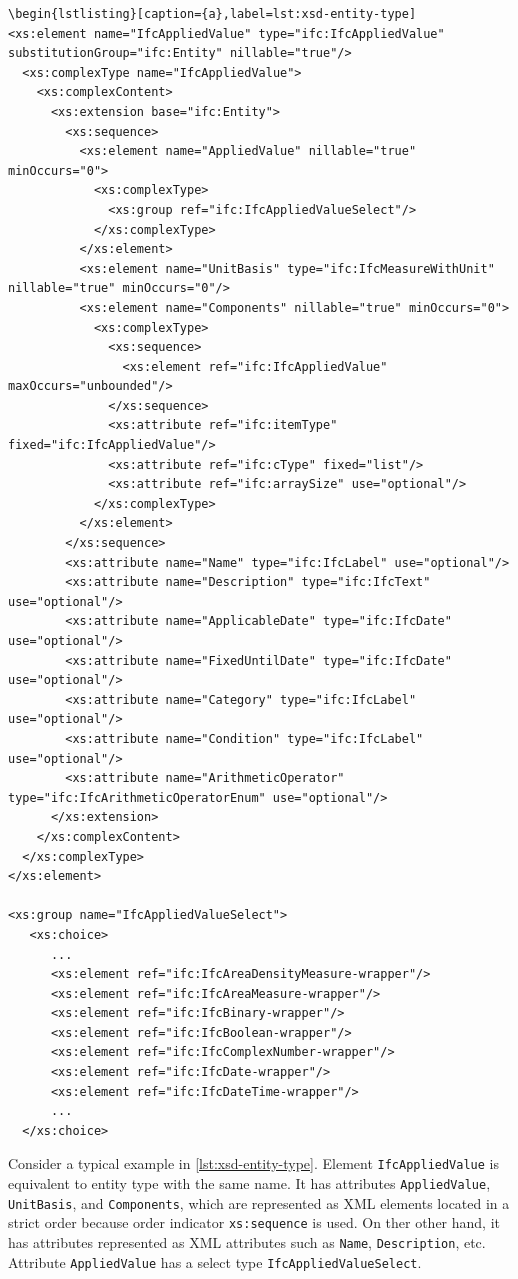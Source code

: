 \begin{lstlisting}[caption={a},label=lst:xsd-entity-type-mixed-element]
\begin{lstlisting}[caption={a},label=lst:xsd-entity-type]
<xs:element name="IfcAppliedValue" type="ifc:IfcAppliedValue" substitutionGroup="ifc:Entity" nillable="true"/>
  <xs:complexType name="IfcAppliedValue">
    <xs:complexContent>
      <xs:extension base="ifc:Entity">
        <xs:sequence>
          <xs:element name="AppliedValue" nillable="true" minOccurs="0">
            <xs:complexType>
              <xs:group ref="ifc:IfcAppliedValueSelect"/>
            </xs:complexType>
          </xs:element>
          <xs:element name="UnitBasis" type="ifc:IfcMeasureWithUnit" nillable="true" minOccurs="0"/>
          <xs:element name="Components" nillable="true" minOccurs="0">
            <xs:complexType>
              <xs:sequence>
                <xs:element ref="ifc:IfcAppliedValue" maxOccurs="unbounded"/>
              </xs:sequence>
              <xs:attribute ref="ifc:itemType" fixed="ifc:IfcAppliedValue"/>
              <xs:attribute ref="ifc:cType" fixed="list"/>
              <xs:attribute ref="ifc:arraySize" use="optional"/>
            </xs:complexType>
          </xs:element>
        </xs:sequence>
        <xs:attribute name="Name" type="ifc:IfcLabel" use="optional"/>
        <xs:attribute name="Description" type="ifc:IfcText" use="optional"/>
        <xs:attribute name="ApplicableDate" type="ifc:IfcDate" use="optional"/>
        <xs:attribute name="FixedUntilDate" type="ifc:IfcDate" use="optional"/>
        <xs:attribute name="Category" type="ifc:IfcLabel" use="optional"/>
        <xs:attribute name="Condition" type="ifc:IfcLabel" use="optional"/>
        <xs:attribute name="ArithmeticOperator" type="ifc:IfcArithmeticOperatorEnum" use="optional"/>
      </xs:extension>
    </xs:complexContent>
  </xs:complexType>
</xs:element>

<xs:group name="IfcAppliedValueSelect">
   <xs:choice>
      ...
      <xs:element ref="ifc:IfcAreaDensityMeasure-wrapper"/>
      <xs:element ref="ifc:IfcAreaMeasure-wrapper"/>
      <xs:element ref="ifc:IfcBinary-wrapper"/>
      <xs:element ref="ifc:IfcBoolean-wrapper"/>
      <xs:element ref="ifc:IfcComplexNumber-wrapper"/>
      <xs:element ref="ifc:IfcDate-wrapper"/>
      <xs:element ref="ifc:IfcDateTime-wrapper"/>
      ...
  </xs:choice>
\end{lstlisting}


Consider a typical example in \autoref{lst:xsd-entity-type}.
Element \texttt{IfcAppliedValue} is equivalent to entity type with the same name.
It has attributes \texttt{AppliedValue}, \texttt{UnitBasis}, and \texttt{Components}, which are represented as XML elements located in a strict order because order indicator \texttt{xs:sequence} is used.
On ther other hand, it has attributes represented as XML attributes such as \texttt{Name}, \texttt{Description}, etc.
Attribute \texttt{AppliedValue} has a select type \texttt{IfcAppliedValueSelect}.



